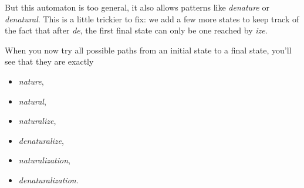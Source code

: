 \begin{examplebox}
    But this automaton is too general, it also allows patterns like \emph{denature} or \emph{denatural}.
    This is a little trickier to fix: we add a few more states to keep track of the fact that after \emph{de}, the first final state can only be one reached by \emph{ize}.
    \begin{center}
    \end{center}
    When you now try all possible paths from an initial state to a final state, you'll see that they are exactly
    \begin{itemize}
        \item \emph{nature},
        \item \emph{natural},
        \item \emph{naturalize},
        \item \emph{denaturalize},
        \item \emph{naturalization},
        \item \emph{denaturalization}.
    \end{itemize}
\end{examplebox}

